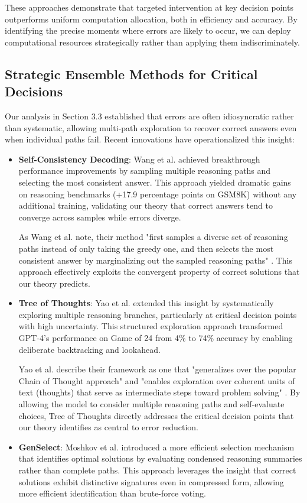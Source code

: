\documentclass{article}
\begin{document}
These approaches demonstrate that targeted intervention at key decision points outperforms uniform computation allocation, both in efficiency and accuracy. By identifying the precise moments where errors are likely to occur, we can deploy computational resources strategically rather than applying them indiscriminately.

\subsection{Strategic Ensemble Methods for Critical Decisions}

Our analysis in Section 3.3 established that errors are often idiosyncratic rather than systematic, allowing multi-path exploration to recover correct answers even when individual paths fail. Recent innovations have operationalized this insight:

\begin{itemize}
\item \textbf{Self-Consistency Decoding}: Wang et al. \citep{wang2023self} achieved breakthrough performance improvements by sampling multiple reasoning paths and selecting the most consistent answer. This approach yielded dramatic gains on reasoning benchmarks (+17.9 percentage points on GSM8K) without any additional training, validating our theory that correct answers tend to converge across samples while errors diverge.

  As Wang et al. note, their method "first samples a diverse set of reasoning paths instead of only taking the greedy one, and then selects the most consistent answer by marginalizing out the sampled reasoning paths" \citep{wang2023self}. This approach effectively exploits the convergent property of correct solutions that our theory predicts.

\item \textbf{Tree of Thoughts}: Yao et al. \citep{yao2023tree} extended this insight by systematically exploring multiple reasoning branches, particularly at critical decision points with high uncertainty. This structured exploration approach transformed GPT-4's performance on Game of 24 from 4\% to 74\% accuracy by enabling deliberate backtracking and lookahead.

  Yao et al. describe their framework as one that "generalizes over the popular Chain of Thought approach" and "enables exploration over coherent units of text (thoughts) that serve as intermediate steps toward problem solving" \citep{yao2023tree}. By allowing the model to consider multiple reasoning paths and self-evaluate choices, Tree of Thoughts directly addresses the critical decision points that our theory identifies as central to error reduction.

\item \textbf{GenSelect}: Moshkov et al. \citep{moshkov2025aimo} introduced a more efficient selection mechanism that identifies optimal solutions by evaluating condensed reasoning summaries rather than complete paths. This approach leverages the insight that correct solutions exhibit distinctive signatures even in compressed form, allowing more efficient identification than brute-force voting.
\end{itemize}
\end{document}
